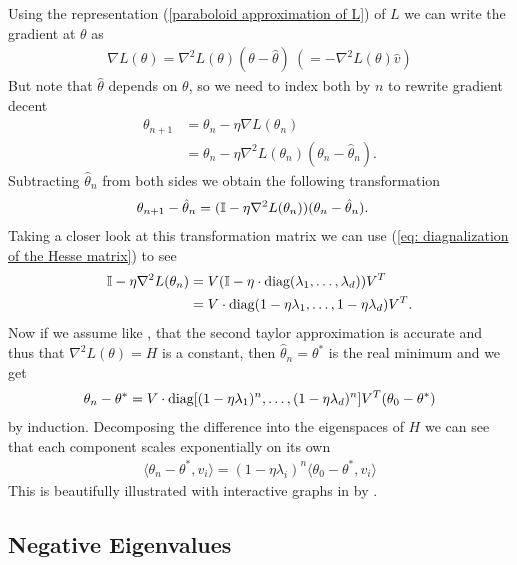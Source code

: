 Using the representation (\ref{paraboloid approximation of L}) of \(L\) we
can write the gradient at \(\theta\) as
%
\begin{align*}
	\nabla L(\theta)
	=  \nabla^2 L(\theta)(\theta-\hat{\theta})
	\ (= -\nabla^2 L(\theta)\hat{v})
\end{align*}
%
But note that \(\hat{\theta}\) depends on \(\theta\), so we need to index both
by \(n\) to rewrite gradient decent
%
\begin{align*}
	\theta_{n+1} &= \theta_n - \eta\nabla L(\theta_n)\\
	&= \theta_n - \eta\nabla^2 L(\theta_n)(\theta_n - \hat{\theta}_n).
\end{align*}
%
Subtracting \(\hat{\theta}_n\) from both sides we obtain the following
transformation 
%
\begin{align}\label{eq: Matrix GD Formulation}
	\theta_{n+1} - \hat{\theta}_n
	&= (\mathbb{I} - \eta\nabla^2 L(\theta_n) ) (\theta_n - \hat{\theta}_n).
\end{align}
%
Taking a closer look at this transformation matrix we can use (\ref{eq:
diagnalization of the Hesse matrix}) to see
%
\begin{align*}
	\mathbb{I} - \eta\nabla^2 L(\theta_n)
	&= V(\mathbb{I} - \eta\cdot\text{diag}(\lambda_1,\dots,\lambda_d) )V^T \\
	&= V\cdot\text{diag}(1-\eta\lambda_1, \dots,1-\eta\lambda_d)V^T.
\end{align*}
%
Now if we assume like \textcite{gohWhyMomentumReally2017}, that the second
taylor approximation is accurate and thus that \(\nabla^2 L(\theta)=H\) is a
constant, then \(\hat{\theta}_n = \theta^*\) is the real minimum and we get
%
\begin{align}
	\theta_n - \theta^*
	= V\cdot\text{diag}[(1-\eta\lambda_1)^n,\dots,(1-\eta\lambda_d)^n] V^T (\theta_0 - \theta^*)
\end{align}
%
by induction. Decomposing the difference into the eigenspaces of \(H\) we can 
see that each component scales exponentially on its own 
%
\begin{align*}
	\langle \theta_n -\theta^*, v_i\rangle
	= (1-\eta\lambda_i)^n \langle \theta_0 - \theta^*, v_i\rangle
\end{align*}
%
This is beautifully illustrated with interactive graphs in
 by \citeauthor{gohWhyMomentumReally2017}.

\subsection{Negative Eigenvalues}\label{subsec: Negative Eigenvalues}

